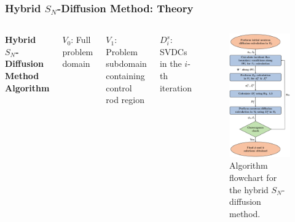 \begin{frame}
  \frametitle{Hybrid $S_N$-Diffusion Method: Theory}
  \begin{columns}
    \textbf{Hybrid $S_N$-Diffusion Method Algorithm}
    \vspace{.5cm}

  {\small
  $V_0$: Full problem domain
  \vspace{.1cm}

  $V_1$: Problem subdomain containing control rod region
  \vspace{.1cm}

  $D^s_i$: SVDCs in the $i$-th iteration
\vspace{4cm}}
  \begin{figure}
    \centering
    \includegraphics[width=.49\textwidth]{images/algorithm}
    \begin{minipage}[b]{.49\textwidth}
      \caption{Algorithm flowchart for the hybrid $S_N$-diffusion method.}
    \end{minipage}
  \end{figure}
\end{columns}
\end{frame}

